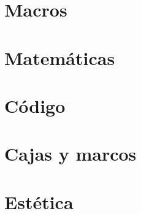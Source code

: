 \documentclass[11pt,twoside,titlepage,a4paper]{article}
\theoremstyle{ejemplo}
\theoremstyle{nota}
\begin{document}

\newpage
\section{Macros}


\newpage
\section{Matemáticas}


\newpage
\section{Código}


\newpage
\section{Cajas y marcos}


\newpage
\section{Estética}
\end{document}

